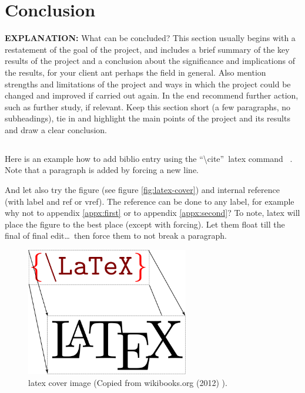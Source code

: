 \documentclass[11pt,a4paper,oneside,article]{memoir}
\begin{document}
\chapter{Conclusion}
\textbf{EXPLANATION:} What can be concluded? This section usually begins with a restatement of the goal of the project, and includes a brief summary of the key results of the project and a conclusion about the significance and implications of the results, for your client ant perhaps the field in general. Also mention strengths and limitations of the project and ways in which the project could be changed and improved if carried out again. In the end recommend further action, such as further study, if relevant. Keep this section short (a few paragraphs, no subheadings), tie in and highlight the main points of the project and its results and draw a clear conclusion.



\section{}
Here is an example how to add biblio entry \cite{kopka:guide} using the \textquotedblleft\textbackslash{}cite\textquotedblright ~\gls{latex} command ~\cite[section 4.2]{tobias:book}. Note that a paragraph is added by forcing a new line.

And let also try the figure (see figure \vref{fig:latex-cover}) and internal reference (with label and ref or vref). The reference can be done to any label, for example why not to appendix \ref{appx:first} or to appendix \ref{appx:second}? To note, \gls{latex} will place the figure to the best place (except with forcing). Let them float till the final of final edit\ldots ~then force them to not break a paragraph.%
\begin{figure}[h]
  \centering
  \includegraphics[width=7.1cm]{LaTeX_cover}
  \caption{\gls{latex} cover image (Copied from wikibooks.org (2012) \cite{wikibooks:latex}).}
  \label{fig:latex-cover}
\end{figure}
\end{document}
